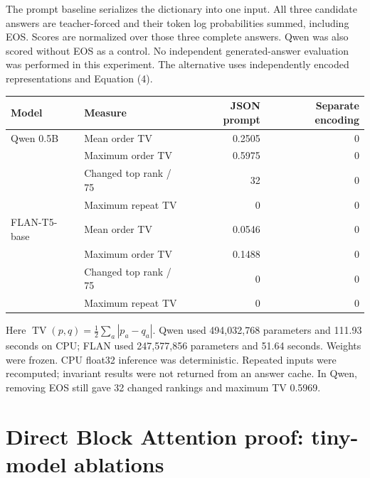 \documentclass[11pt]{article}
\begin{document}
The prompt baseline serializes the dictionary into one input. All three candidate answers are teacher-forced and their token log probabilities summed, including EOS. Scores are normalized over those three complete answers. Qwen was also scored without EOS as a control. No independent generated-answer evaluation was performed in this experiment. The alternative uses independently encoded representations and Equation (4).
\begin{center}\small
\begin{tabular}{llrr}\toprule
Model & Measure & JSON prompt & Separate encoding\\\midrule
Qwen 0.5B & Mean order TV & 0.2505 & 0\\
 & Maximum order TV & 0.5975 & 0\\
 & Changed top rank / 75 & 32 & 0\\
 & Maximum repeat TV & 0 & 0\\\midrule
FLAN-T5-base & Mean order TV & 0.0546 & 0\\
 & Maximum order TV & 0.1488 & 0\\
 & Changed top rank / 75 & 0 & 0\\
 & Maximum repeat TV & 0 & 0\\\bottomrule
\end{tabular}\end{center}
Here $\operatorname{TV}(p,q)=\tfrac12\sum_a|p_a-q_a|$. Qwen used 494,032,768 parameters and 111.93 seconds on CPU; FLAN used 247,577,856 parameters and 51.64 seconds. Weights were frozen. CPU float32 inference was deterministic. Repeated inputs were recomputed; invariant results were not returned from an answer cache. In Qwen, removing EOS still gave 32 changed rankings and maximum TV 0.5969.

\section{Direct Block Attention proof: tiny-model ablations}
\end{document}
